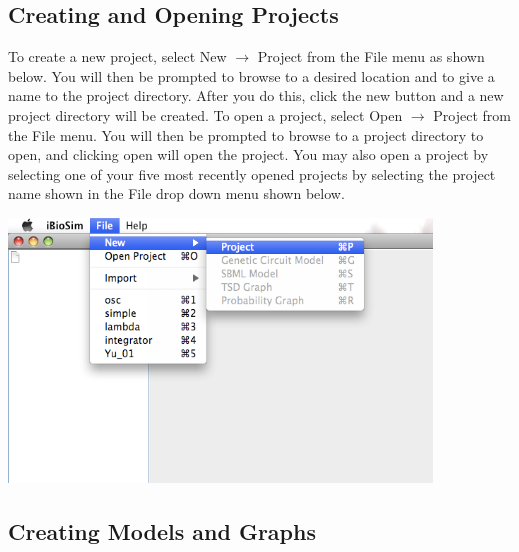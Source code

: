 \documentclass[titlepage,11pt]{article}
\begin{document}
\subsection{Creating and Opening Projects}

\noindent
To create a new project, select New $\rightarrow$ Project from the File
menu as shown below. You will then be prompted to browse to a desired location
and to give a name to the project directory. After you do this,
click the new button and a new project directory will be created.
To open a project, select Open $\rightarrow$ Project from the File menu.
You will then be prompted to browse to a project directory to
open, and clicking open will open the project. You may also open
a project by selecting one of your five most recently opened
projects by selecting the project name shown in the File drop
down menu shown below.
\begin{center}
\includegraphics[height=70mm]{screenshots/project}
\end{center}

\subsection{Creating Models and Graphs}
\end{document}

